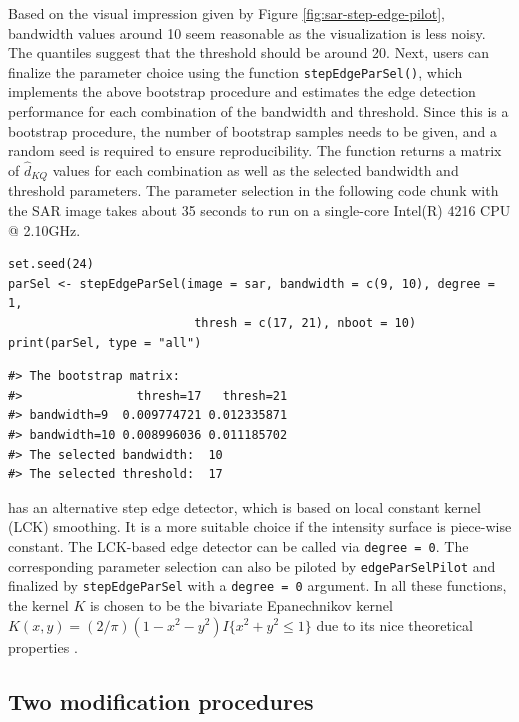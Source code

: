 Based on the visual impression given by Figure \ref{fig:sar-step-edge-pilot}, bandwidth values around 10 seem reasonable as the visualization is less noisy. The quantiles suggest that the threshold should be around 20. Next, users can finalize the parameter choice using the function \texttt{stepEdgeParSel()}, which implements the above bootstrap procedure and estimates the edge detection performance for each combination of the bandwidth and threshold. Since this is a bootstrap procedure, the number of bootstrap samples needs to be given, and a random seed is required to ensure reproducibility. The function returns a matrix of \(\widehat{d}_{KQ}\) values for each combination as well as the selected bandwidth and threshold parameters. The parameter selection in the following code chunk with the SAR image takes about 35 seconds to run on a single-core Intel(R) 4216 CPU @ 2.10GHz.

\begin{verbatim}
set.seed(24)
parSel <- stepEdgeParSel(image = sar, bandwidth = c(9, 10), degree = 1, 
                          thresh = c(17, 21), nboot = 10)
print(parSel, type = "all")
\end{verbatim}

\begin{verbatim}
#> The bootstrap matrix:
#>                thresh=17   thresh=21
#> bandwidth=9  0.009774721 0.012335871
#> bandwidth=10 0.008996036 0.011185702
#> The selected bandwidth:  10 
#> The selected threshold:  17
\end{verbatim}

 has an alternative step edge detector, which is based on local constant kernel (LCK) smoothing. It is a more suitable choice if the intensity surface is piece-wise constant. The LCK-based edge detector can be called via \texttt{degree\ =\ 0}. The corresponding parameter selection can also be piloted by \texttt{edgeParSelPilot} and finalized by \texttt{stepEdgeParSel} with a \texttt{degree\ =\ 0} argument. In all these functions, the kernel \(K\) is chosen to be the bivariate Epanechnikov kernel \(K(x, y) = (2/\pi)(1 - x^2 - y^2)I\{x^2 + y^2 \leq 1 \}\) due to its nice theoretical properties \citep{fan2018local}.

\subsection{Two modification procedures}\label{sec:JLC.MPs}

